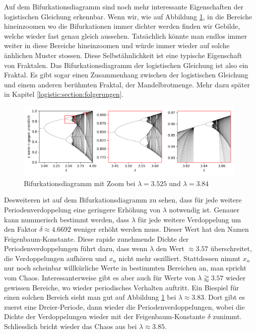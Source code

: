 Auf dem Bifurkationsdiagramm sind noch mehr 
interessante Eigenschaften der logistischen Gleichung erkennbar.
Wenn wir, wie auf Abbildung \ref{fig:map_zoom}, in die Bereiche hineinzoomen
wo die Bifurkationen immer dichter werden finden wir Gebilde, 
welche wieder fast genau gleich aussehen.
Tatsächlich könnte man endlos immer weiter in diese
Bereiche hineinzoomen und würde immer wieder auf solche änhlichen Muster stossen. 
Diese Selbstähnlichkeit ist eine typische Eigenschaft von Fraktalen.
Das Bifurkationsdiagramm der logistischen Gleichung ist also ein Fraktal.
Es gibt sogar einen Zusammenhang zwischen der logistischen Gleichung und 
einem anderen berühmten Fraktal, der Mandelbrotmenge.
Mehr dazu später in Kapitel \ref{logistic:section:folgerungen}.
\begin{figure}
    \includegraphics[width=\linewidth]{papers/logistic/figures/map_zoom.png}
    \caption{Bifurkationsdiagramm mit Zoom bei $\lambda = 3.525$ und $\lambda = 3.84$}
    \label{fig:map_zoom}
\end{figure}

Desweiteren ist auf dem Bifurkationsdiagramm zu sehen,
dass für jede weitere Periodenverdoppelung eine geringere
Erhöhung von $\lambda$ notwendig ist.
Genauer kann nummerisch bestimmt werden, 
dass $\lambda$ für jede weitere Verdoppelung um
den Faktor $\delta \approx 4.6692$ weniger erhöht werden muss.
Dieser Wert hat den Namen Feigenbaum-Konstante.
Diese rapide zunehmende Dichte der Periodenverdoppelungen führt dazu, 
dass wenn $\lambda$ den Wert $\approx 3.57$ überschreitet, 
die Verdoppelungen aufhören und $x_n$ nicht mehr oszilliert. 
Stattdessen nimmt $x_n$ nur noch scheinbar 
willkürliche Werte in bestimmten Bereichen an, 
man spricht vom Chaos.
Interessanterweise gibt es aber auch für Werte von 
$\lambda \gtrapprox 3.57$ wieder gewissen Bereiche,
wo wieder periodisches Verhalten auftritt. 
Ein Biespiel für einen solchen Bereich sieht man
gut auf Abbildung \ref{fig:map_zoom} bei 
$\lambda \approx 3.83$. 
Dort gibt es zuerst eine Dreier-Periode, 
dann wieder die Periodenverdoppelungen, 
wobei die Dichte der Verdoppelungen
wieder mit der Feigenbaum-Konstante $\delta$ zunimmt.
Schliesslich bricht wieder das Chaos aus bei 
$\lambda \approx 3.85$.
